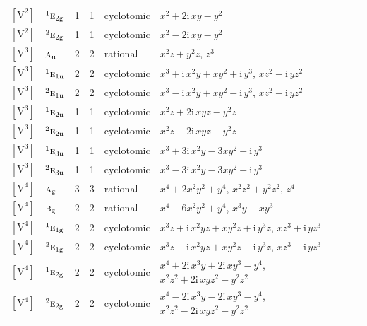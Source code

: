 \documentclass[10pt,a4paper]{article}
\numberwithin{equation}{section}
\newcommand{\irr}[1]{\text{\normalfont\scshape #1}}
\newcommand{\conjpair}[1]{{}^{#1}}
\newcommand{\ptag}[1]{\mathrm{#1}}
\newcommand{\iunit}{\mathrm{i}}
\newcommand{\jahn}[1]{\mathrm{#1}}
\newlength{\fillwidth}\newlength{\cellwidth}\newlength{\colwidth}
\begin{document}
{\begin{longtable}{@{}llrrl>{\RaggedRight\arraybackslash}p{\fillwidth}@{}}
$\jahn{[V^{2}]}$ & $\conjpair{1}\irr{e}_{2\ptag{g}}$ & 1 & 1 & cyclotomic & $x^{2} + 2\iunit{}\,xy - y^{2}$\\
$\jahn{[V^{2}]}$ & $\conjpair{2}\irr{e}_{2\ptag{g}}$ & 1 & 1 & cyclotomic & $x^{2} - 2\iunit{}\,xy - y^{2}$\\
$\jahn{[V^{3}]}$ & $\irr{a}_{\ptag{u}}$ & 2 & 2 & rational & $x^{2}z + y^{2}z$, $z^{3}$\\
$\jahn{[V^{3}]}$ & $\conjpair{1}\irr{e}_{1\ptag{u}}$ & 2 & 2 & cyclotomic & $x^{3} + \iunit{}\,x^{2}y + xy^{2} + \iunit{}\,y^{3}$, $xz^{2} + \iunit{}\,yz^{2}$\\
$\jahn{[V^{3}]}$ & $\conjpair{2}\irr{e}_{1\ptag{u}}$ & 2 & 2 & cyclotomic & $x^{3} - \iunit{}\,x^{2}y + xy^{2} - \iunit{}\,y^{3}$, $xz^{2} - \iunit{}\,yz^{2}$\\
$\jahn{[V^{3}]}$ & $\conjpair{1}\irr{e}_{2\ptag{u}}$ & 1 & 1 & cyclotomic & $x^{2}z + 2\iunit{}\,xyz - y^{2}z$\\
$\jahn{[V^{3}]}$ & $\conjpair{2}\irr{e}_{2\ptag{u}}$ & 1 & 1 & cyclotomic & $x^{2}z - 2\iunit{}\,xyz - y^{2}z$\\
$\jahn{[V^{3}]}$ & $\conjpair{1}\irr{e}_{3\ptag{u}}$ & 1 & 1 & cyclotomic & $x^{3} + 3\iunit{}\,x^{2}y - 3xy^{2} - \iunit{}\,y^{3}$\\
$\jahn{[V^{3}]}$ & $\conjpair{2}\irr{e}_{3\ptag{u}}$ & 1 & 1 & cyclotomic & $x^{3} - 3\iunit{}\,x^{2}y - 3xy^{2} + \iunit{}\,y^{3}$\\
$\jahn{[V^{4}]}$ & $\irr{a}_{\ptag{g}}$ & 3 & 3 & rational & $x^{4} + 2x^{2}y^{2} + y^{4}$, $x^{2}z^{2} + y^{2}z^{2}$, $z^{4}$\\
$\jahn{[V^{4}]}$ & $\irr{b}_{\ptag{g}}$ & 2 & 2 & rational & $x^{4} - 6x^{2}y^{2} + y^{4}$, $x^{3}y - xy^{3}$\\
$\jahn{[V^{4}]}$ & $\conjpair{1}\irr{e}_{1\ptag{g}}$ & 2 & 2 & cyclotomic & $x^{3}z + \iunit{}\,x^{2}yz + xy^{2}z + \iunit{}\,y^{3}z$, $xz^{3} + \iunit{}\,yz^{3}$\\
$\jahn{[V^{4}]}$ & $\conjpair{2}\irr{e}_{1\ptag{g}}$ & 2 & 2 & cyclotomic & $x^{3}z - \iunit{}\,x^{2}yz + xy^{2}z - \iunit{}\,y^{3}z$, $xz^{3} - \iunit{}\,yz^{3}$\\
$\jahn{[V^{4}]}$ & $\conjpair{1}\irr{e}_{2\ptag{g}}$ & 2 & 2 & cyclotomic & $x^{4} + 2\iunit{}\,x^{3}y + 2\iunit{}\,xy^{3} - y^{4}$, $x^{2}z^{2} + 2\iunit{}\,xyz^{2} - y^{2}z^{2}$\\
$\jahn{[V^{4}]}$ & $\conjpair{2}\irr{e}_{2\ptag{g}}$ & 2 & 2 & cyclotomic & $x^{4} - 2\iunit{}\,x^{3}y - 2\iunit{}\,xy^{3} - y^{4}$, $x^{2}z^{2} - 2\iunit{}\,xyz^{2} - y^{2}z^{2}$\\

\end{longtable}}
\end{document}
